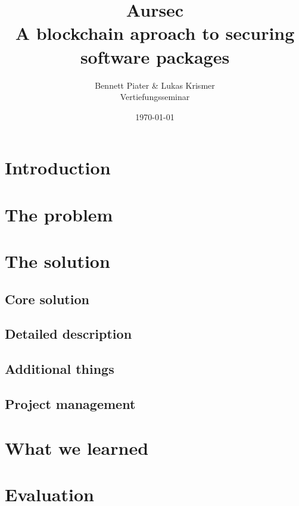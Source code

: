 \documentclass[a4paper,11pt]{article}
\title{Aursec\\A blockchain aproach to securing software packages}
\author{Bennett Piater \& Lukas Krismer\\Vertiefungsseminar}
\date{\today}
\begin{document}
  \begin{titlepage}
    \maketitle
    \thispagestyle{empty}
  \end{titlepage}

  \begin{abstract}
  \end{abstract}

  \tableofcontents
  \listoffigures
  \listoftables
  \pagebreak


  \section{Introduction}

  \section{The problem}

  \section{The solution}
    \subsection{Core solution}
    \subsection{Detailed description}
    \subsection{Additional things}
    \subsection{Project management}

  \section{What we learned}

  \section{Evaluation}

  \pagebreak
  
  
\end{document}
